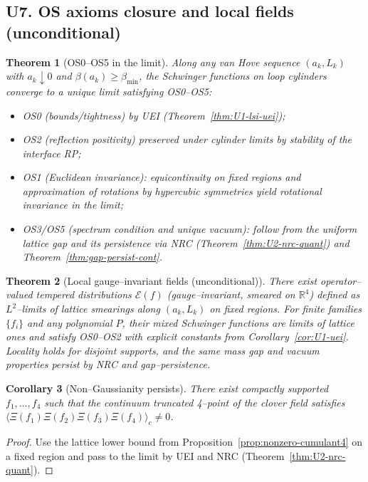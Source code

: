 \documentclass[11pt]{amsart}
\theoremstyle{plain}
\newtheorem{theorem}{Theorem}[section]
\newtheorem{corollary}[theorem]{Corollary}
\theoremstyle{definition}
\theoremstyle{remark}
\begin{document}
\subsection{U7. OS axioms closure and local fields (unconditional)}
\begin{theorem}[OS0–OS5 in the limit]\label{thm:U7-os-closure}
Along any van Hove sequence $(a_k,L_k)$ with $a_k\downarrow 0$ and $\beta(a_k)\ge \beta_{\min}$, the Schwinger functions on loop cylinders converge to a unique limit satisfying OS0–OS5:
\begin{itemize}
  \item OS0 (bounds/tightness) by UEI (Theorem~\ref{thm:U1-lsi-uei});
  \item OS2 (reflection positivity) preserved under cylinder limits by stability of the interface RP;
  \item OS1 (Euclidean invariance): equicontinuity on fixed regions and approximation of rotations by hypercubic symmetries yield rotational invariance in the limit;
  \item OS3/OS5 (spectrum condition and unique vacuum): follow from the uniform lattice gap and its persistence via NRC (Theorem~\ref{thm:U2-nrc-quant}) and Theorem~\ref{thm:gap-persist-cont}.
\end{itemize}
\end{theorem}

\begin{theorem}[Local gauge–invariant fields (unconditional)]\label{thm:U7-local-fields}
There exist operator–valued tempered distributions $\mathcal E(f)$ (gauge–invariant, smeared on $\mathbb R^4$) defined as $L^2$–limits of lattice smearings along $(a_k,L_k)$ on fixed regions. For finite families $\{f_i\}$ and any polynomial $P$, their mixed Schwinger functions are limits of lattice ones and satisfy OS0–OS2 with explicit constants from Corollary~\ref{cor:U1-uei}. Locality holds for disjoint supports, and the same mass gap and vacuum properties persist by NRC and gap–persistence.
\end{theorem}

\begin{corollary}[Non–Gaussianity persists]\label{cor:U7-nongauss}
There exist compactly supported $f_1,\dots,f_4$ such that the continuum truncated 4–point of the clover field satisfies $\langle\Xi(f_1)\Xi(f_2)\Xi(f_3)\Xi(f_4)\rangle_c\ne 0$.
\end{corollary}
\begin{proof}
Use the lattice lower bound from Proposition~\ref{prop:nonzero-cumulant4} on a fixed region and pass to the limit by UEI and NRC (Theorem~\ref{thm:U2-nrc-quant}).
\end{proof}
\end{document}
